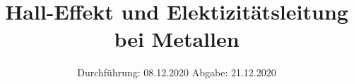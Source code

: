

\subject{V311}
\title{Hall-Effekt und Elektizitätsleitung bei Metallen}
\date{%
  Durchführung: 08.12.2020
  \hspace{3em}
  Abgabe: 21.12.2020
}



\maketitle
\thispagestyle{empty}
\tableofcontents
\newpage







\printbibliography{}
\nocite{*}

